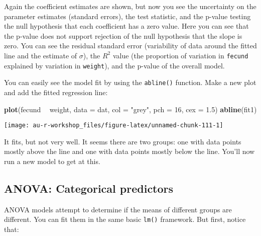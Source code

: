 \documentclass[]{book}
\newenvironment{Shaded}{\begin{snugshade}}{\end{snugshade}}
\newcommand{\KeywordTok}[1]{\textcolor[rgb]{0.13,0.29,0.53}{\textbf{#1}}}
\newcommand{\DataTypeTok}[1]{\textcolor[rgb]{0.13,0.29,0.53}{#1}}
\newcommand{\DecValTok}[1]{\textcolor[rgb]{0.00,0.00,0.81}{#1}}
\newcommand{\FloatTok}[1]{\textcolor[rgb]{0.00,0.00,0.81}{#1}}
\newcommand{\StringTok}[1]{\textcolor[rgb]{0.31,0.60,0.02}{#1}}
\newcommand{\OperatorTok}[1]{\textcolor[rgb]{0.81,0.36,0.00}{\textbf{#1}}}
\newcommand{\NormalTok}[1]{#1}
\theoremstyle{definition}
\theoremstyle{definition}
\theoremstyle{definition}
\theoremstyle{remark}
\begin{document}
Again the coefficient estimates are shown, but now you see the
uncertainty on the parameter estimates (standard errors), the test
statistic, and the p-value testing the null hypothesis that each
coefficient has a zero value. Here you can see that the p-value does not
support rejection of the null hypothesis that the slope is zero. You can
see the residual standard error (variability of data around the fitted
line and the estimate of \(\sigma\)), the \(R^2\) value (the proportion
of variation in \texttt{fecund} explained by variation in
\texttt{weight}), and the p-value of the overall model.

You can easily see the model fit by using the \texttt{abline()}
function. Make a new plot and add the fitted regression line:

\begin{Shaded}
\begin{Highlighting}[]
\KeywordTok{plot}\NormalTok{(fecund }\OperatorTok{~}\StringTok{ }\NormalTok{weight, }\DataTypeTok{data =}\NormalTok{ dat, }\DataTypeTok{col =} \StringTok{"grey"}\NormalTok{, }\DataTypeTok{pch =} \DecValTok{16}\NormalTok{, }\DataTypeTok{cex =} \FloatTok{1.5}\NormalTok{)}
\KeywordTok{abline}\NormalTok{(fit1)}
\end{Highlighting}
\end{Shaded}

\begin{center}\texttt{[image: au-r-workshop\_files/figure-latex/unnamed-chunk-111-1]} \end{center}

It fits, but not very well. It seems there are two groups: one with data
points mostly above the line and one with data points mostly below the
line. You'll now run a new model to get at this.

\subsection{ANOVA: Categorical predictors}\label{anova}

ANOVA models attempt to determine if the means of different groups are
different. You can fit them in the same basic \texttt{lm()} framework.
But first, notice that:

\begin{Shaded}
\end{Shaded}
\end{document}
